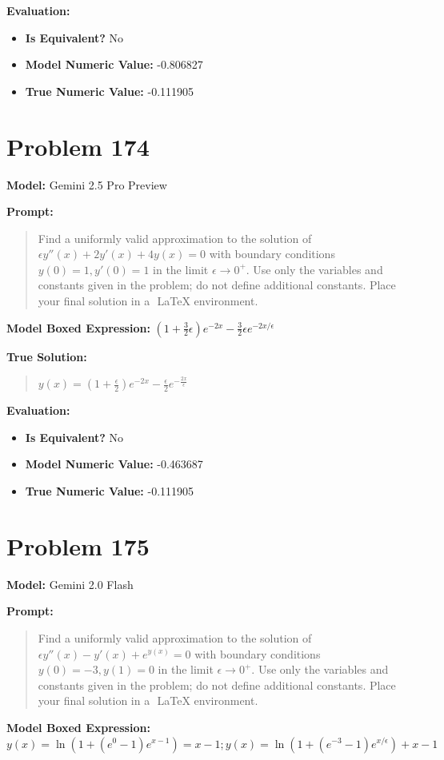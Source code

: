 \documentclass{article}
\begin{document}
{\textbf{Evaluation:}
\begin{itemize}
\item \textbf{Is Equivalent?} No
\item \textbf{Model Numeric Value:} -0.806827
\item \textbf{True Numeric Value:} -0.111905
\end{itemize}
\vspace{1cm}
\section*{Problem 174}
\textbf{Model:} Gemini 2.5 Pro Preview

\textbf{Prompt:}
\begin{quote}
Find a uniformly valid approximation to the solution of $\epsilon y''(x) + 2y' (x)+ 4y(x) = 0$ with boundary conditions $y(0) = 1, y'(0) = 1$ in the limit $\epsilon \to 0^+$. Use only the variables and constants given in the problem; do not define additional constants. Place your final solution in a $\boxed{}$ LaTeX environment.
\end{quote}
\textbf{Model Boxed Expression:} $\left(1 + \frac{3}{2}\epsilon\right)e^{-2x} - \frac{3}{2}\epsilon e^{-2x/\epsilon}$

\textbf{True Solution:}
\begin{quote}
$y(x) = (1 + \frac{\epsilon}{2})e^{-2x} - \frac{\epsilon}{2} e^{-\frac{2x}{\epsilon}}$
\end{quote}

\textbf{Evaluation:}
\begin{itemize}
\item \textbf{Is Equivalent?} No
\item \textbf{Model Numeric Value:} -0.463687
\item \textbf{True Numeric Value:} -0.111905
\end{itemize}
\vspace{1cm}
\section*{Problem 175}
\textbf{Model:} Gemini 2.0 Flash

\textbf{Prompt:}
\begin{quote}
Find a uniformly valid approximation to the solution of $\epsilon y''(x) - y'(x) + e^{y(x)} = 0$ with boundary conditions $y(0) = -3, y(1) = 0$ in the limit $\epsilon \to 0^+$. Use only the variables and constants given in the problem; do not define additional constants. Place your final solution in a $\boxed{}$ LaTeX environment.
\end{quote}
\textbf{Model Boxed Expression:} $y(x) = \ln(1 + (e^0 - 1)e^{x-1}) = x-1; y(x) = \ln(1 + (e^{-3} - 1)e^{x/\epsilon}) + x - 1$

}
\end{document}
